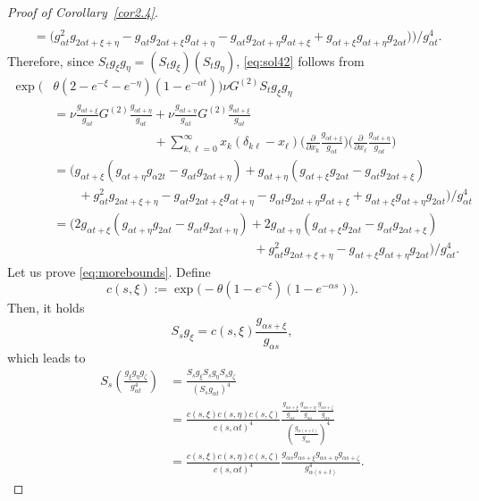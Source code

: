 \documentclass{imsart}
\theoremstyle{plain}
\theoremstyle{definition}
\begin{document}
\begin{proof}[Proof of Corollary~\ref{cor2.4}]
\begin{align*}
  \\ & = \Big(g_{\alpha t}^2 g_{2\alpha t+\xi+\eta} - g_{\alpha t} g_{2\alpha t+\xi} g_{\alpha t + \eta} - g_{\alpha t} g_{2\alpha t+\eta}g_{\alpha t + \xi} + g_{\alpha t +\xi}g_{\alpha t + \eta}g_{2\alpha t})\Big) / g_{\alpha t}^4.
\end{align*}
Therefore, since $S_t g_{ \xi} g_{ \eta} = (S_t g_{ \xi})(S_t g_{ \eta})$, \eqref{eq:sol42} follows from
\begin{align*}
    \exp\Big( & \theta(2 - e^{- \xi} - e^{- \eta})(1 - e^{-\alpha t}) \Big) \nu G^{(2)}S_t g_{ \xi} g_{ \eta}  \\ & = \nu\frac{g_{\alpha t + \xi}}{g_{\alpha t}} G^{(2)} \frac{g_{\alpha t + \eta}}{g_{\alpha t}} + \nu\frac{g_{\alpha t + \eta}}{g_{\alpha t}} G^{(2)} \frac{g_{\alpha t + \xi}}{g_{\alpha t}} \\ & \qquad \qquad \qquad \qquad + \sum_{k,\ell=0}^\infty 
    x_k(\delta_{k\ell} - x_\ell) \Big(\frac{\partial}{\partial x_k}\frac{g_{\alpha t + \xi}}{g_{\alpha t}} \Big) \Big(\frac{\partial}{\partial x_\ell} \frac{g_{\alpha t + \eta}}{g_{\alpha t}}\Big)
    \\ & = 
    \Big(g_{\alpha t + \xi}(g_{\alpha t + \eta}g_{\alpha 2t} - g_{\alpha t}g_{2\alpha t + \eta}) + g_{\alpha t + \eta} (g_{\alpha t + \xi}g_{2\alpha t} - g_{\alpha t}g_{2\alpha t+\xi}) \\ & \qquad + g_{\alpha t}^2 g_{2\alpha t+\xi+\eta} - g_{\alpha t} g_{2\alpha t+\xi}g_{\alpha t + \eta} - g_{\alpha t} g_{2\alpha t+\eta}g_{\alpha t + \xi} + g_{\alpha t +\xi}g_{\alpha t + \eta}g_{2\alpha t}\Big)/g_{\alpha t}^4 \\ & = \Big(
    2g_{\alpha t + \xi}(g_{\alpha t + \eta}g_{2\alpha t} - g_{\alpha t}g_{2\alpha t + \eta}) + 2g_{\alpha t + \eta}(g_{\alpha t + \xi}g_{2\alpha t} - g_{\alpha t}g_{2\alpha t+\xi}) \\ & \qquad \qquad \qquad \qquad \qquad \qquad \qquad \qquad + g_{\alpha t}^2 g_{2\alpha t+\xi+\eta} - g_{\alpha t + \xi}g_{\alpha t + \eta}g_{2\alpha t}\Big) / g_{\alpha t}^4.
\end{align*}
Let us prove \eqref{eq:morebounds}. Define
$$
c(s,\xi):=
\exp\Big(
-\theta(1-e^{-\xi})(1-e^{-\alpha s})
\Big).
$$
Then, it holds
$$
S_s g_{\xi}  =c(s,\xi)\frac{g_{\alpha s+\xi}  }{g_{\alpha s}  },
$$
which leads to
\begin{align*}
S_s\left(
\frac{
g_{\xi}g_{\eta}g_{\zeta}
}{g_{\alpha t}^4}
\right)  
&=
\frac{
S_s g_{\xi}  S_s g_{\eta}  S_s g_{\zeta}  
}{
(S_s g_{\alpha t}  )^4
} \\
&=
\frac{
c(s,\xi)c(s,\eta)c(s,\zeta)
}{
c(s,\alpha t)^4
}
\frac{
\frac{g_{\alpha s + \xi}  }{g_{\alpha s}  }
\frac{g_{\alpha s + \eta}  }{g_{\alpha s}  }
\frac{g_{\alpha s + \zeta}  }{g_{\alpha s}  }
}{
\left(\frac{g_{\alpha (s+t)}  }{g_{\alpha s}  }\right)^4
} \\
&=
\frac{
c(s,\xi)c(s,\eta)c(s,\zeta)
}{
c(s,\alpha t)^4
}
\frac{
g_{\alpha s}  g_{\alpha s + \xi}  g_{\alpha s + \eta}  g_{\alpha s + \zeta}  
}{
g_{\alpha (s+t)}  ^4
}.
\end{align*}


\end{proof}
\end{document}
